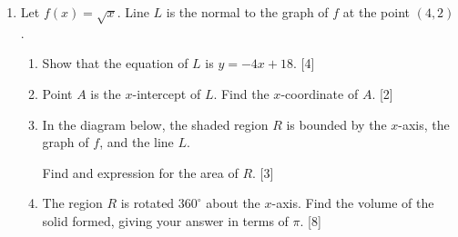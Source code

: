 \documentclass[12pt, twoside]{article}
\begin{document}
\begin{enumerate}
\item Let $f(x)=\sqrt{x}$. Line $L$ is the normal to the graph of $f$ at the point $(4,2)$.
  \begin{enumerate}
    \item Show that the equation of $L$ is $y=-4x+18$. \hfill [4]
    \item Point $A$ is the $x$-intercept of $L$. Find the $x$-coordinate of $A$. \hfill [2]
    \item In the diagram below, the shaded region $R$ is bounded by the $x$-axis, the graph of $f$, and the line $L$.
      \begin{center}
      \end{center}
      Find and expression for the area of $R$.  \hfill [3]
    \item The region $R$ is rotated $360^\circ$ about the $x$-axis. Find the volume of the solid formed, giving your answer in terms of $\pi$.  \hfill [8]
  \end{enumerate}



\end{enumerate}
\end{document}
